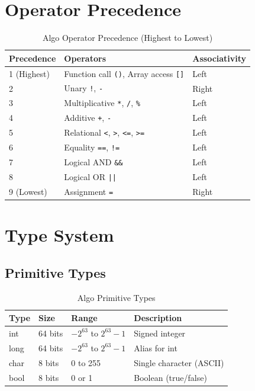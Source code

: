\documentclass[12pt,a4paper,oneside]{book}
\newcommand{\code}[1]{\texttt{#1}}
\begin{document}
\section{Operator Precedence}

\begin{table}[H]
\centering
\caption{Algo Operator Precedence (Highest to Lowest)}
\label{tab:operator-precedence}
\begin{tabularx}{\textwidth}{|l|X|l|}
\hline
\textbf{Precedence} & \textbf{Operators} & \textbf{Associativity} \\
\hline
1 (Highest) & Function call \code{()}, Array access \code{[]} & Left \\
\hline
2 & Unary \code{!}, \code{-} & Right \\
\hline
3 & Multiplicative \code{*}, \code{/}, \code{\%} & Left \\
\hline
4 & Additive \code{+}, \code{-} & Left \\
\hline
5 & Relational \code{<}, \code{>}, \code{<=}, \code{>=} & Left \\
\hline
6 & Equality \code{==}, \code{!=} & Left \\
\hline
7 & Logical AND \code{\&\&} & Left \\
\hline
8 & Logical OR \code{||} & Left \\
\hline
9 (Lowest) & Assignment \code{=} & Right \\
\hline
\end{tabularx}
\end{table}

\section{Type System}

\subsection{Primitive Types}

\begin{table}[H]
\centering
\caption{Algo Primitive Types}
\begin{tabularx}{\textwidth}{|l|l|l|X|}
\hline
\textbf{Type} & \textbf{Size} & \textbf{Range} & \textbf{Description} \\
\hline
int & 64 bits & $-2^{63}$ to $2^{63}-1$ & Signed integer \\
\hline
long & 64 bits & $-2^{63}$ to $2^{63}-1$ & Alias for int \\
\hline
char & 8 bits & 0 to 255 & Single character (ASCII) \\
\hline
bool & 8 bits & 0 or 1 & Boolean (true/false) \\
\hline
\end{tabularx}
\end{table}
\end{document}
